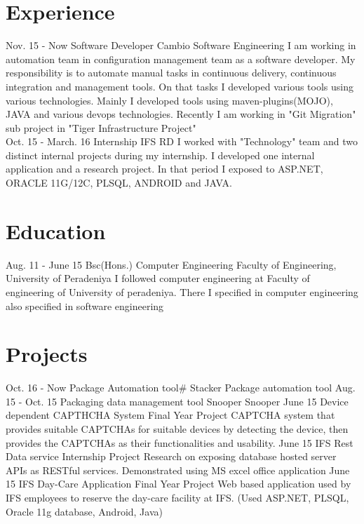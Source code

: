 \documentclass[]{cv-class}
\begin{document}
\section{Experience}
\begin{entrylist}
  \entry
    {Nov. 15 - Now}
    {Software Developer}
    {Cambio Software Engineering}
    {I am working in automation team in configuration management team as a software developer. My responsibility 
    is to automate manual tasks in continuous delivery, continuous integration and management tools. On that tasks
    I developed various tools using various technologies. Mainly I developed tools using maven-plugins(MOJO), JAVA 
    and various devops technologies. Recently I am working in "Git Migration" sub project in "Tiger Infrastructure Project"\\}
  \entry
    {Oct. 15 - March. 16}
    {Internship}
    {IFS RD}
    {I worked with "Technology" team and two distinct internal projects during my internship. I developed one internal
	application and a research project. In that period I exposed to ASP.NET, ORACLE 11G/12C, PLSQL, ANDROID and JAVA.}
\end{entrylist}

\section{Education}
\begin{entrylist}
  \entry
    {Aug. 11 - June 15}
    {Bsc(Hons.) Computer Engineering}
    {Faculty of Engineering, University of Peradeniya}
    {I followed computer engineering at Faculty of engineering of University of peradeniya. There I specified in computer 		   	engineering also specified in software engineering}
\end{entrylist}



\section{Projects}
\begin{entrylist}
  \entry
    {Oct. 16 - Now}
    {Package Automation tool\#}
    {Stacker}
    {Package automation tool}
  \entry
    {Aug. 15 - Oct. 15}
    {Packaging data management tool}
    {Snooper}
    {Snooper}
  \entry
    {June 15}
    {Device dependent CAPTHCHA System}
    {Final Year Project}
    {CAPTCHA system that provides suitable CAPTCHAs for suitable devices
	by  detecting  the  device,  then  provides  the  CAPTCHAs  as  their 
	functionalities and usability.}
  \entry
    {June 15}
    {IFS Rest Data service}
    {Internship Project}
    {Research on exposing database hosted server  APIs  as  RESTful  services. 
	Demonstrated  using  MS  excel  office  application}
  \entry
    {June 15}
    {IFS Day-Care Application}
    {Final Year Project}
    {Web  based  application  used  by  IFS  employees  to  reserve  the  day-care 
	facility at IFS. (Used ASP.NET, PLSQL, Oracle 11g database, Android, 
	Java)}
  
\end{entrylist}
\end{document}

